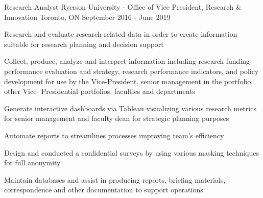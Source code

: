 \begin{cventries}
  \cventry
    {Research Analyst} %
    {Ryerson University - Office of Vice President, Research \& Innovation} %
    {Toronto, ON} %
    {September 2016 - June 2019} %
    {
      \begin{cvitems} %
        \item {Research and evaluate research-related data in order to create information suitable for research planning and decision support}
        \item {Collect, produce, analyze and interpret information including research funding performance evaluation and strategy, research performance indicators, and policy development for use by the Vice-President, senior management in the portfolio, other Vice- Presidential portfolios, faculties and departments}
        \item {Generate interactive dashboards via Tableau visualizing various research metrics for senior management and faculty dean for strategic planning purposes}
        \item {Automate reports to streamlines processes improving team's efficiency}
        \item {Design and conducted a confidential surveys by using various masking techniques for full anonymity}
        \item {Maintain databases and assist in producing reports, briefing materials, correspondence and other documentation to support operations}
        {}
      \end{cvitems}
    }

\end{cventries}
